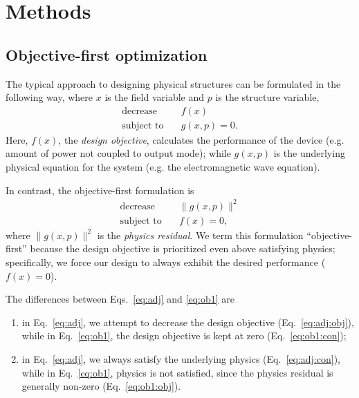 \documentclass[letterpaper,10pt]{article}
\begin{document}
\section{Methods}
\subsection{Objective-first optimization}
The typical approach to designing physical structures can be formulated 
    in the following way, 
    where $x$ is the field variable and $p$ is the structure variable,
    \begin{subequations}\label{eq:adj}
    \begin{align} 
    \text{decrease} & \quad f(x) \label{eq:adj:obj} \\ 
    \text{subject to} & \quad g(x,p) = 0. \label{eq:adj:con}
    \end{align}
    \end{subequations}
Here, $f(x)$, the \emph{design objective}, 
    calculates the performance of the device 
    (e.g. amount of power not coupled to output mode); 
    while $g(x,p)$ is the underlying physical equation for the system
    (e.g. the electromagnetic wave equation).

In contrast, the objective-first formulation is
    \begin{subequations}\label{eq:ob1}
    \begin{align} 
    \text{decrease} & \quad \|g(x,p)\|^2 \label{eq:ob1:obj} \\ 
    \text{subject to} & \quad f(x) = 0, \label{eq:ob1:con}
    \end{align}
    \end{subequations}
    where $\|g(x,p)\|^2$ is the \emph{physics residual}.
We term this formulation ``objective-first''
    because the design objective is prioritized even above satisfying physics;
    specifically, we force our design to always exhibit the desired performance
    ($f(x) = 0$).

The differences between Eqs.~\ref{eq:adj} and \ref{eq:ob1} are
\begin{enumerate}
    \item in Eq.~\ref{eq:adj}, we attempt to decrease the design objective 
            (Eq.~\ref{eq:adj:obj}), 
        while in Eq.~\ref{eq:ob1}, the design objective is kept at zero 
            (Eq.~\ref{eq:ob1:con}); 
    \item in Eq.~\ref{eq:adj}, we always satisfy the underlying physics 
            (Eq.~\ref{eq:adj:con}),
        while in Eq.~\ref{eq:ob1}, physics is not satisfied,
            since the physics residual is generally non-zero
            (Eq.~\ref{eq:ob1:obj}).
\end{enumerate}
\end{document}
